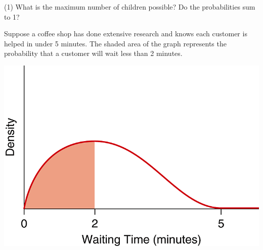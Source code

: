 \documentclass[../mathNotesPreamble]{subfiles}
\begin{document}
  \begin{extasks}[after-item-skip=\stretch{1}](1)
    \task What is the maximum number of children possible?
    \task Do the probabilities sum to 1?
  \end{extasks}
  \pagebreak

  \begin{center}
  \end{center}
  \vspace*{2\baselineskip}
  
  \begin{ex*}
    Suppose a coffee shop has done extensive research and knows each customer is helped in under 5 minutes. The shaded area of the graph represents the probability that a customer will wait less than 2 minutes.
  \end{ex*}
  \begin{center}
    \includegraphics[width=0.4\linewidth]{images/math211_figure_6p6}
  \end{center}
  \pagebreak
\end{document}
